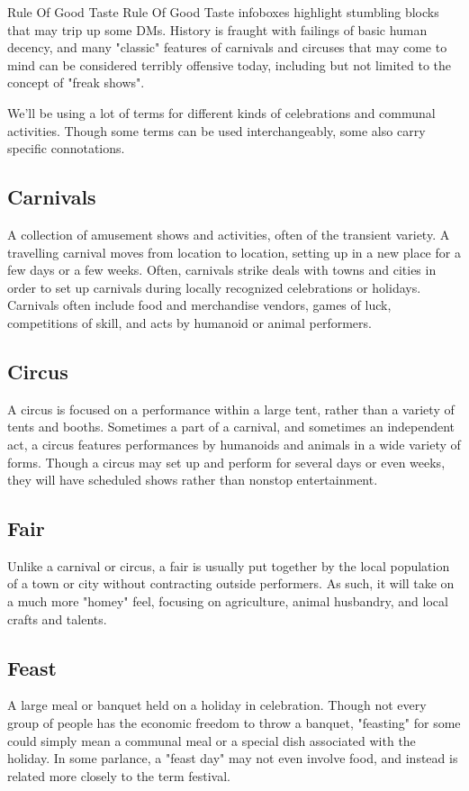 \documentclass[10pt,a4paper,twoside,twocolumn,openany,bg=print,nodeprecatedcode]{dndbook}
\begin{document}
\begin{DndComment}{Rule Of Good Taste}
Rule Of Good Taste infoboxes highlight stumbling blocks that may trip up some DMs. History is fraught with failings of basic human decency, and many "classic" features of carnivals and circuses that may come to mind can be considered terribly offensive today, including but not limited to the concept of "freak shows".
\end{DndComment}

We'll be using a lot of terms for different kinds of celebrations and communal activities. Though some terms can be used interchangeably, some also carry specific connotations.
\subsection{Carnivals}
A collection of amusement shows and activities, often of the transient variety. A travelling carnival moves from location to location, setting up in a new place for a few days or a few weeks. Often, carnivals strike deals with towns and cities in order to set up carnivals during locally recognized celebrations or holidays. Carnivals often include food and merchandise vendors, games of luck, competitions of skill, and acts by humanoid or animal performers.
\subsection{Circus}
A circus is focused on a performance within a large tent, rather than a variety of tents and booths. Sometimes a part of a carnival, and sometimes an independent act, a circus features performances by humanoids and animals in a wide variety of forms. Though a circus may set up and perform for several days or even weeks, they will have scheduled shows rather than nonstop entertainment.
\subsection{Fair}
Unlike a carnival or circus, a fair is usually put together by the local population of a town or city without contracting outside performers. As such, it will take on a much more "homey" feel, focusing on agriculture, animal husbandry, and local crafts and talents.
\subsection{Feast}
A large meal or banquet held on a holiday in celebration. Though not every group of people has the economic freedom to throw a banquet, "feasting" for some could simply mean a communal meal or a special dish associated with the holiday. In some parlance, a "feast day" may not even involve food, and instead is related more closely to the term festival.
\end{document}
